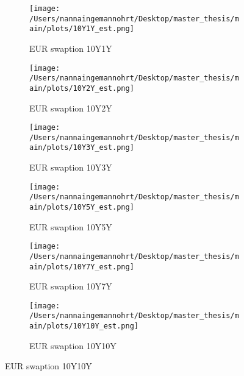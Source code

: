 \begin{figure}[htbp]
    \centering
    \begin{subfigure}{0.43\textwidth}
        \texttt{[image: /Users/nannaingemannohrt/Desktop/master\_thesis/main/plots/10Y1Y\_est.png]}
        \caption{EUR swaption 10Y1Y}
        \label{fig:10Y1Y_}
    \end{subfigure}\hfill
    \begin{subfigure}{0.43
        \textwidth}
        \texttt{[image: /Users/nannaingemannohrt/Desktop/master\_thesis/main/plots/10Y2Y\_est.png]}
        \caption{EUR swaption 10Y2Y}
        \label{fig:10Y2Y_}
    \end{subfigure}
    \begin{subfigure}{0.43\textwidth}
        \texttt{[image: /Users/nannaingemannohrt/Desktop/master\_thesis/main/plots/10Y3Y\_est.png]}
        \caption{EUR swaption 10Y3Y}
        \label{fig:10Y3Y_}
    \end{subfigure}\hfill
    \begin{subfigure}{0.43\textwidth}
        \texttt{[image: /Users/nannaingemannohrt/Desktop/master\_thesis/main/plots/10Y5Y\_est.png]}
        \caption{EUR swaption 10Y5Y}
        \label{fig:10Y5Y_}
    \end{subfigure}
    \begin{subfigure}{0.43\textwidth}
        \texttt{[image: /Users/nannaingemannohrt/Desktop/master\_thesis/main/plots/10Y7Y\_est.png]}
        \caption{EUR swaption 10Y7Y}
        \label{fig:10Y7Y_}
    \end{subfigure}\hfill
    \begin{subfigure}{0.43\textwidth}
        \texttt{[image: /Users/nannaingemannohrt/Desktop/master\_thesis/main/plots/10Y10Y\_est.png]}
        \caption{EUR swaption 10Y10Y}
        \label{fig:10Y10Y_}
    \end{subfigure}


\end{figure}
